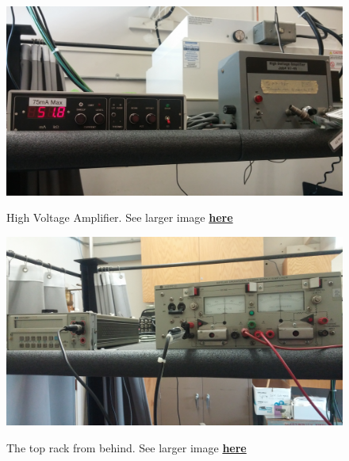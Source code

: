 \documentclass{../lab}
\begin{document}
\begin{figure}[H]
\captionsetup{justification=centering}
\begin{minipage}[t]{0.32\textwidth}
    \href{http://experimentationlab.berkeley.edu/sites/default/files/images/MNOhighvamp.jpg}{\includegraphics[width=\linewidth,keepaspectratio]{images/MNOhighvamp.jpg}}
    \caption{High Voltage Amplifier. See larger image \href{http://experimentationlab.berkeley.edu/sites/default/files/images/MNOhighvamp.jpg}{\textbf{here}}}
\end{minipage}
\begin{minipage}[t]{0.32\textwidth}
    \href{http://experimentationlab.berkeley.edu/sites/default/files/images/MNOtopback.jpg}{\includegraphics[width=\linewidth,keepaspectratio]{images/MNOtopback.jpg}}
    \caption{The top rack from behind. See larger image \href{http://experimentationlab.berkeley.edu/sites/default/files/images/MNOtopback.jpg}{\textbf{here}}}
\end{minipage}
\begin{minipage}[t]{0.32\textwidth}

\end{minipage}
\end{figure}
\end{document}
